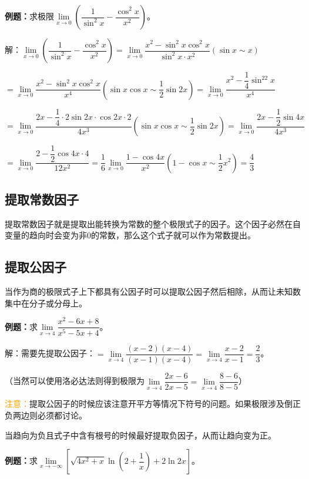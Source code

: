 \documentclass[UTF8, 12pt]{ctexart}
\begin{document}
\textbf{例题：}求极限$\lim\limits_{x\to 0}\left(\dfrac{1}{\sin^2x}-\dfrac{\cos^2x}{x^2}\right)$。\medskip

解：$\lim\limits_{x\to 0}\left(\dfrac{1}{\sin^2x}-\dfrac{\cos^2x}{x^2}\right)=\lim\limits_{x\to 0}\dfrac{x^2-\sin^2x\cos^2x}{\sin^2x\cdot x^2} (\sin x\sim x)$ \medskip

$=\lim\limits_{x\to 0}\dfrac{x^2-\sin^2x\cos^2x}{x^4} (\sin x\cos x\sim\dfrac{1}{2}\sin 2x)=\lim\limits_{x\to 0}\dfrac{x^2-\dfrac{1}{4}\sin^22x}{x^4}$ \medskip

$=\lim\limits_{x\to 0}\dfrac{2x-\dfrac{1}{4}\cdot 2\sin 2x\cdot\cos 2x\cdot 2}{4x^3} (\sin x\cos x\sim\dfrac{1}{2}\sin 2x)=\lim\limits_{x\to 0}\dfrac{2x-\dfrac{1}{2}\sin 4x}{4x^3}$ \medskip

$=\lim\limits_{x\to 0}\dfrac{2-\dfrac{1}{2}\cos 4x\cdot 4}{12x^2}=\dfrac{1}{6}\lim\limits_{x\to 0}\dfrac{1-\cos 4x}{x^2} (1-\cos x\sim \dfrac{1}{2}x^2)=\dfrac{4}{3}$

\subsection{提取常数因子}

提取常数因子就是提取出能转换为常数的整个极限式子的因子。这个因子必然在自变量的趋向时会变为非0的常数，那么这个式子就可以作为常数提出。

\subsection{提取公因子}

当作为商的极限式子上下都具有公因子时可以提取公因子然后相除，从而让未知数集中在分子或分母上。

\textbf{例题：}求$\lim\limits_{x\to 4}\dfrac{x^2-6x+8}{x^5-5x+4}$。

解：需要先提取公因子：$=\lim\limits_{x\to 4}\dfrac{(x-2)(x-4)}{(x-1)(x-4)}=\lim\limits_{x\to 4}\dfrac{x-2}{x-1}=\dfrac{2}{3}$。

（当然可以使用洛必达法则得到极限为$\lim\limits_{x\to 4}\dfrac{2x-6}{2x-5}=\lim\limits_{x\to 4}\dfrac{8-6}{8-5}$）

\textcolor{orange}{注意：}提取公因子的时候应该注意开平方等情况下符号的问题。如果极限涉及倒正负两边则必须都讨论。

当趋向为负且式子中含有根号的时候最好提取负因子，从而让趋向变为正。\medskip

\textbf{例题：}求$\lim\limits_{x\to-\infty}\left[\sqrt{4x^2+x}\ln\left(2+\dfrac{1}{x}\right)+2\ln 2x\right]$。\medskip
\end{document}
